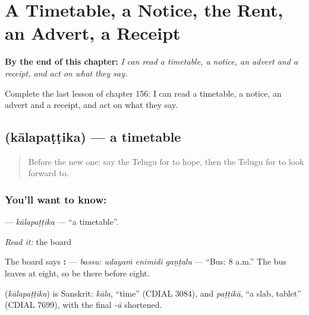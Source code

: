 
\chapter{A Timetable, a Notice, the Rent, an Advert, a Receipt}
\label{ch:te-a-timetable-a-notice-the-rent-an-advert-a-receipt}

\begin{chapteropening}
\textbf{By the end of this chapter:} \emph{I can read a timetable, a notice, an advert and a receipt, and act on what they say.}

Complete the last lesson of chapter 156: I can read a timetable, a notice, an advert and a receipt, and act on what they say.
\end{chapteropening}

\section[\texorpdfstring{\te{కాలపట్టిక} (kālapaṭṭika)}{కాలపట్టిక (kālapaṭṭika)}]{ (kālapaṭṭika) — a timetable}

\label{lesson:TE-C156-kalapattika}



\begin{quote}
Before the new one: say the Telugu for to hope, then the Telugu for to look forward to.
\end{quote}

\subsection*{You'll want to know: }
\textbf{} — \emph{kālapaṭṭika} — \textquotedblleft{}a timetable\textquotedblright{}.

\emph{Read it:} the board

The board says \textbf{:   } — \emph{bassu: udayaṁ enimidi gaṇṭalu} — \textquotedblleft{}Bus: 8 a.m.\textquotedblright{} The bus leaves at eight, so be there before eight.

\begin{cousinweb}
\textbf{} (\emph{kālapaṭṭika}) is Sanskrit: \emph{kāla}, \textquotedblleft{}time\textquotedblright{} (CDIAL 3084), and \emph{paṭṭikā}, \textquotedblleft{}a slab, tablet\textquotedblright{} (CDIAL 7699), with the final \emph{-ā} shortened.
\end{cousinweb}


